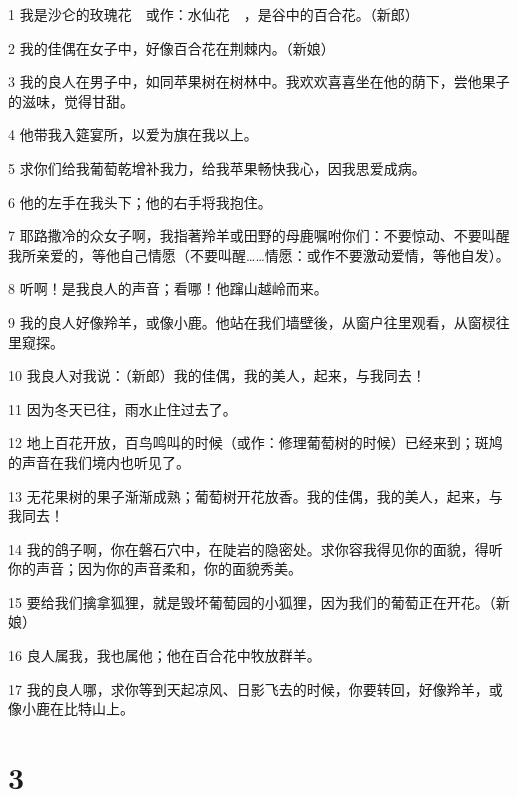 \par 1 我是沙仑的玫瑰花　或作：水仙花　，是谷中的百合花。（新郎）
\par 2 我的佳偶在女子中，好像百合花在荆棘内。（新娘）
\par 3 我的良人在男子中，如同苹果树在树林中。我欢欢喜喜坐在他的荫下，尝他果子的滋味，觉得甘甜。
\par 4 他带我入筵宴所，以爱为旗在我以上。
\par 5 求你们给我葡萄乾增补我力，给我苹果畅快我心，因我思爱成病。
\par 6 他的左手在我头下；他的右手将我抱住。
\par 7 耶路撒冷的众女子啊，我指著羚羊或田野的母鹿嘱咐你们：不要惊动、不要叫醒我所亲爱的，等他自己情愿（不要叫醒……情愿：或作不要激动爱情，等他自发）。
\par 8 听啊！是我良人的声音；看哪！他蹿山越岭而来。
\par 9 我的良人好像羚羊，或像小鹿。他站在我们墙壁後，从窗户往里观看，从窗棂往里窥探。
\par 10 我良人对我说：（新郎）我的佳偶，我的美人，起来，与我同去！
\par 11 因为冬天已往，雨水止住过去了。
\par 12 地上百花开放，百鸟鸣叫的时候（或作：修理葡萄树的时候）已经来到；斑鸠的声音在我们境内也听见了。
\par 13 无花果树的果子渐渐成熟；葡萄树开花放香。我的佳偶，我的美人，起来，与我同去！
\par 14 我的鸽子啊，你在磐石穴中，在陡岩的隐密处。求你容我得见你的面貌，得听你的声音；因为你的声音柔和，你的面貌秀美。
\par 15 要给我们擒拿狐狸，就是毁坏葡萄园的小狐狸，因为我们的葡萄正在开花。（新娘）
\par 16 良人属我，我也属他；他在百合花中牧放群羊。
\par 17 我的良人哪，求你等到天起凉风、日影飞去的时候，你要转回，好像羚羊，或像小鹿在比特山上。

\chapter{3}

